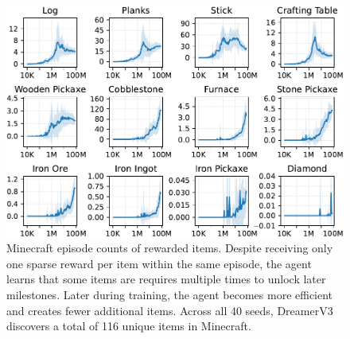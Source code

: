 \begin{figure}[h]
\centering
\includegraphics[width=1\linewidth]{mcitems/mcitems}
\caption{Minecraft episode counts of rewarded items. Despite receiving only one sparse reward per item within the same episode, the agent learns that some items are requires multiple times to unlock later milestones. Later during training, the agent becomes more efficient and creates fewer additional items. Across all 40 seeds, DreamerV3 discovers a total of 116 unique items in Minecraft.}
\label{fig:mcitems}
\end{figure}